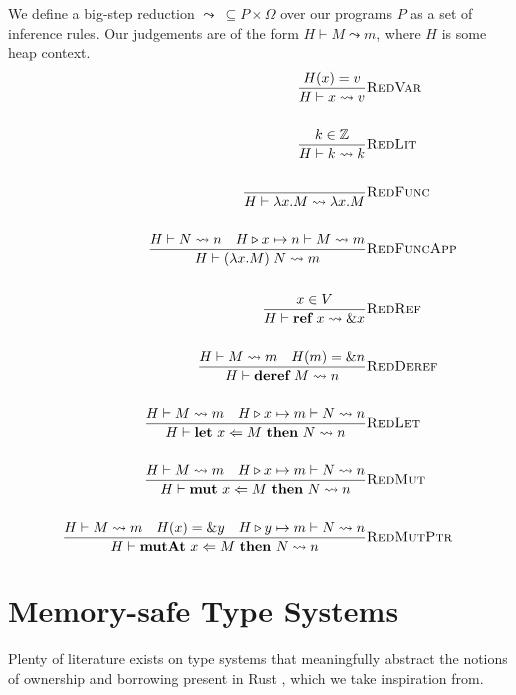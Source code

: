 \documentclass{article}
\newcommand{\agap}{\hspace{0.25em}}
\newcommand{\mkref}{\textbf{ref}~}
\newcommand{\deref}{\textbf{deref}~}%
\newcommand{\mutate}[3]{\textbf{mut}~ #1 \Leftarrow #2 ~\textbf{then}~ #3}
\newcommand{\mutptr}[3]{\textbf{mutAt}~ #1 \Leftarrow #2 ~\textbf{then}~ #3}
\newcommand{\letvar}[3]{\textbf{let}~ #1 \Leftarrow #2 ~\textbf{then}~ #3}
\newcommand{\red}{\leadsto}
\newcommand{\overwrite}{\triangleright}
\begin{document}
We define a big-step reduction $\red ~\subseteq P \times \Omega$ over our programs $P$ as a set of inference rules. Our judgements are of the form $H \vdash M \red m$, where $H$ is some heap context. 
\begin{align*}
    \frac{H(x) = v}{H \vdash x \red v}&\textsc{RedVar}\\
    ~\\
    \frac{k \in \mathbb{Z} }{H \vdash k \red k}&\textsc{RedLit}\\
    ~\\
    \frac{}{H \vdash \lambda x . M \red \lambda x . M}&\textsc{RedFunc}\\
    ~\\
    \frac{H \vdash N \red n \hspace{1em} H \overwrite x \mapsto n \vdash M \red m }{H \vdash (\lambda x . M) \agap N \red m}&\textsc{RedFuncApp}\\
    ~\\
    \frac{x \in V}{H \vdash \mkref x \red \&x}&\textsc{RedRef}\\
    ~\\
    \frac{H \vdash M \red m \hspace{1em} H(m) = \& n }{ H \vdash \deref M \red n }&\textsc{RedDeref}\\
    ~\\
    \frac{H \vdash M \red m \hspace{1em} H \overwrite x \mapsto m \vdash N \red n }{ H \vdash \letvar{x}{M}{N} \red n }&\textsc{RedLet}\\
    ~\\
    \frac{H \vdash M \red m \hspace{1em} H \overwrite x \mapsto m \vdash N \red n }{ H \vdash \mutate{x}{M}{N} \red n }&\textsc{RedMut}\\
    ~\\
    \frac{H \vdash M \red m \hspace{1em} H(x) = \&y \hspace{1em} H \overwrite y \mapsto m \vdash N \red n }{ H \vdash \mutptr{x}{M}{N} \red n }&\textsc{RedMutPtr}\\
\end{align*}

\section{Memory-safe Type Systems}

Plenty of literature exists on type systems that meaningfully abstract the notions of ownership and borrowing present in Rust \cite{marshall2022entente, marshall2024fracunique}, which we take inspiration from. 
\end{document}
